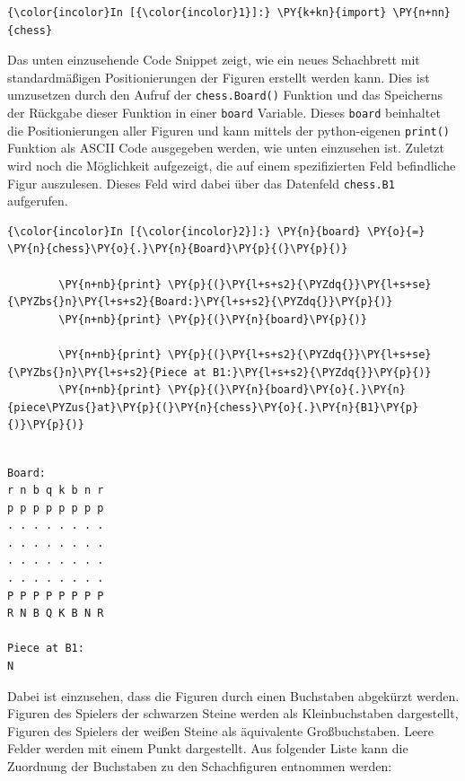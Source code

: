     \begin{Verbatim}[commandchars=\\\{\}]
{\color{incolor}In [{\color{incolor}1}]:} \PY{k+kn}{import} \PY{n+nn}{chess}
\end{Verbatim}


    Das unten einzusehende Code Snippet zeigt, wie ein neues Schachbrett mit
standardmäßigen Positionierungen der Figuren erstellt werden kann. Dies
ist umzusetzen durch den Aufruf der \texttt{chess.Board()} Funktion und
das Speicherns der Rückgabe dieser Funktion in einer \texttt{board}
Variable. Dieses \texttt{board} beinhaltet die Positionierungen aller
Figuren und kann mittels der python-eigenen \texttt{print()} Funktion
als ASCII Code ausgegeben werden, wie unten einzusehen ist. Zuletzt wird
noch die Möglichkeit aufgezeigt, die auf einem spezifizierten Feld
befindliche Figur auszulesen. Dieses Feld wird dabei über das Datenfeld
\texttt{chess.B1} aufgerufen.

    \begin{Verbatim}[commandchars=\\\{\}]
{\color{incolor}In [{\color{incolor}2}]:} \PY{n}{board} \PY{o}{=} \PY{n}{chess}\PY{o}{.}\PY{n}{Board}\PY{p}{(}\PY{p}{)}
            
        \PY{n+nb}{print} \PY{p}{(}\PY{l+s+s2}{\PYZdq{}}\PY{l+s+se}{\PYZbs{}n}\PY{l+s+s2}{Board:}\PY{l+s+s2}{\PYZdq{}}\PY{p}{)}
        \PY{n+nb}{print} \PY{p}{(}\PY{n}{board}\PY{p}{)}
        
        \PY{n+nb}{print} \PY{p}{(}\PY{l+s+s2}{\PYZdq{}}\PY{l+s+se}{\PYZbs{}n}\PY{l+s+s2}{Piece at B1:}\PY{l+s+s2}{\PYZdq{}}\PY{p}{)}
        \PY{n+nb}{print} \PY{p}{(}\PY{n}{board}\PY{o}{.}\PY{n}{piece\PYZus{}at}\PY{p}{(}\PY{n}{chess}\PY{o}{.}\PY{n}{B1}\PY{p}{)}\PY{p}{)}
\end{Verbatim}


    \begin{Verbatim}[commandchars=\\\{\}]

Board:
r n b q k b n r
p p p p p p p p
. . . . . . . .
. . . . . . . .
. . . . . . . .
. . . . . . . .
P P P P P P P P
R N B Q K B N R

Piece at B1:
N

    \end{Verbatim}

    Dabei ist einzusehen, dass die Figuren durch einen Buchstaben abgekürzt
werden. Figuren des Spielers der schwarzen Steine werden als Kleinbuchstaben
dargestellt, Figuren des Spielers der weißen Steine als äquivalente
Großbuchstaben. Leere Felder werden mit einem Punkt dargestellt. Aus
folgender Liste kann die Zuordnung der Buchstaben zu den Schachfiguren
entnommen werden:

